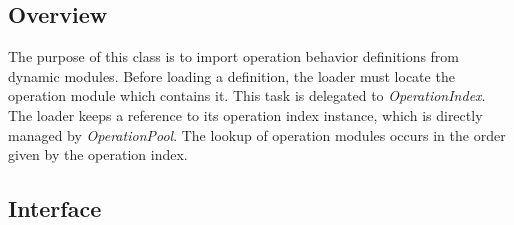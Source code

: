 \documentclass[a4paper,twoside]{tce}
\begin{document}
\subsection{Overview}

The purpose of this class is to import operation behavior definitions from
dynamic modules.  Before loading a definition, the loader must locate the
operation module which contains it.  This task is delegated to
\emph{OperationIndex}.  The loader keeps a reference to its operation index
instance, which is directly managed by \emph{OperationPool}.  The lookup of
operation modules occurs in the order given by the operation index.

\subsection{Interface}
\end{document}
